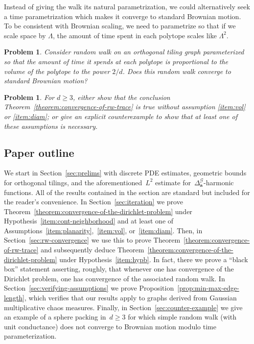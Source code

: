 \documentclass[12pt]{amsart}
\numberwithin{equation}{section}
\newtheorem{problem}[theorem]{Problem}
\newcommand{\aDelta}{\hyperref[eq:geometric-laplacian]{{\Delta^{\mathcal{G}}_{\cond}}}}
\newcommand{\cond}{\hyperref[eq:geometric-laplacian]{\mathbf{a}}}
\begin{document}
Instead of giving the walk its natural parametrization, we could alternatively seek a time parametrization which makes it converge to standard Brownian motion. To be consistent with Brownian scaling, we need to parametrize so that if we scale space by $\Lambda$, the amount of time spent in each polytope scales like $\Lambda^{2 }$. 

\begin{problem}
	Consider random walk on an orthogonal tiling graph parameterized so that the amount of time
	it spends at each polytope is proportional to the volume of the polytope to the power $2/d$.
	Does this random walk converge to standard Brownian motion? 
\end{problem}




\begin{problem} \label{problem:hypotheses}
For $d\geq 3$, either show that the conclusion Theorem~\ref{theorem:convergence-of-rw-trace} is true without assumption \ref{item:vol} or \ref{item:diam}; or give an explicit counterexample to show that at least one of these assumptions is necessary. 
\end{problem}



\subsection{Paper outline} 
We start in Section~\ref{sec:prelims} with discrete PDE estimates, geometric bounds for orthogonal tilings, and the aforementioned~$L^2$ estimate for~$\aDelta$-harmonic functions. All of the results contained in the section are standard but included for the reader's convenience. In Section~\ref{sec:iteration} we prove Theorem~\ref{theorem:convergence-of-the-dirichlet-problem} under Hypothesis~\ref{item:cont-neighborhood} and at least one of Assumptions~\ref{item:planarity},~\ref{item:vol}, or~\ref{item:diam}. 
Then, in Section~\ref{sec:rw-convergence} we use this to prove Theorem~\ref{theorem:convergence-of-rw-trace} and subsequently deduce Theorem~\ref{theorem:convergence-of-the-dirichlet-problem} under Hypothesis~\ref{item:hypb}. In fact, there we prove a ``black box'' statement asserting, roughly, that whenever one has convergence of the Dirichlet problem, one has convergence of the associated random walk. In Section~\ref{sec:verifying-assumptions} we prove Proposition~\ref{prop:min-max-edge-length}, which verifies that our results apply to graphs derived from Gaussian multiplicative chaos measures. 
Finally, in Section~\ref{sec:counter-example} we give an example of a sphere packing in~$d \geq 3$ for which simple random walk (with unit conductance)
does not converge to Brownian motion modulo time parameterization. 
\end{document}
